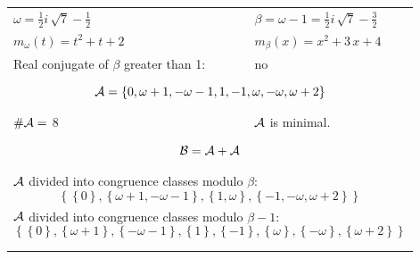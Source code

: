 \begin{exmp}
\label{ex:compareAM}


\rule{0cm}{0cm}

\begin{tabular}{ll}
$\omega=  \frac{1}{2} i \, \sqrt{7} - \frac{1}{2} $  & $\beta= \omega - 1 = \frac{1}{2} i \, \sqrt{7} - \frac{3}{2} $\\
$m_\omega(t)=  t^{2} + t + 2 $  & $m_\beta(x)=  x^{2} + 3 \, x + 4 $\\
Real conjugate of $\beta$ greater than 1:   &  no \\ \hline
\multicolumn{2}{l}{\begin{minipage}{\textwidth}\begin{dmath*}\A = \left\{0, \omega + 1, -\omega - 1, 1, -1, \omega, -\omega, \omega + 2\right\}  \end{dmath*}\end{minipage} }\\
$\#\mathcal{A}= $ 8 $ $ & $\mathcal{A}$ is minimal. \\
\multicolumn{2}{l}{\begin{minipage}{\textwidth}\begin{dmath*}\B =\A+\A \end{dmath*}\end{minipage} }\\[10pt]
\multicolumn{2}{l}{\begin{minipage}{\textwidth}$\mathcal{A}$ divided into congruence classes modulo $\beta$: \begin{dmath*} \left\{\left\{0\right\}, \left\{\omega + 1, -\omega - 1\right\}, \left\{1, \omega\right\}, \left\{-1, -\omega, \omega + 2\right\}\right\}  \end{dmath*}\end{minipage} }\\[10pt]
\multicolumn{2}{l}{\begin{minipage}{\textwidth}$\mathcal{A}$ divided into congruence classes modulo $\beta-1$: \begin{dmath*} \left\{\left\{0\right\}, \left\{\omega + 1\right\}, \left\{-\omega - 1\right\}, \left\{1\right\}, \left\{-1\right\}, \left\{\omega\right\}, \left\{-\omega\right\}, \left\{\omega + 2\right\}\right\}  \end{dmath*}\end{minipage} }\\
 & \\ \hline
 & \\
\end{tabular}


\end{exmp}
